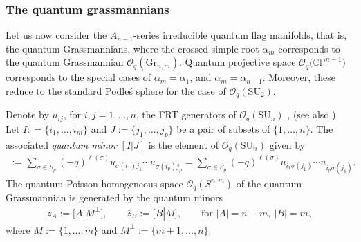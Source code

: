 \documentclass[10pt,a4paper]{amsart}
\numberwithin{equation}{section}
\begin{document}
\subsubsection{The quantum grassmannians}

Let us now consider the $A_{n-1}$-series irreducible quantum flag manifolds, that is, the quantum Grassmannians, where the crossed simple root $\alpha_m$ corresponds to the quantum Grassmannian $\mathcal{O}_q(\mathrm{Gr}_{n,m})$. Quantum projective space $\mathcal{O}_q\big(\mathbb{CP}^{n-1}\big)$ corresponds to the special cases of $\alpha_m = \alpha_1$, and $\alpha_m = \alpha_{n-1}$. Moreover, these reduce to the standard Podle\'s sphere for the case of $\mathcal{O}_q(\mathrm{SU}_2)$.

Denote by $u_{ij}$, for $i,j = 1, \dots, n$, the FRT generators of $\mathcal{O}_q(\mathrm{SU}_n)$ \cite{FRT89}, (see also \cite[Section~9.2]{KSLeabh}). Let $I: = \{i_1, \dots, i_m\}$ and $J:=\{j_1, \dots, j_p\}$ be a pair of subsets of $\{1,\dots, n\}$. The associated {\em quantum minor} $[I|J]$ is the element of $\mathcal{O}_q(\mathrm{SU}_n)$ given by
\begin{gather*}
[I|J] := \sum_{\sigma \in S_p} (-q)^{\ell(\sigma)}u_{\sigma(i_1)j_1} \cdots u_{\sigma(i_p)j_p} = \sum_{\sigma \in S_p} (-q)^{\ell(\sigma)} u_{i_1\sigma(j_1)} \cdots u_{i_p\sigma(j_p)}.
\end{gather*}
The quantum Poisson homogeneous space $\mathcal{O}_q(S^{n,m})$ of the quantum Grassmannian is generated by the quantum minors
\begin{gather*}
z_{A} := \big[A|M^{\perp}\big], \qquad \overline{z}_B := [B|M], \qquad \textrm{for } |A| = n-m, \ |B| = m,
\end{gather*}
where $M := \{1, \dots, m\}$ and $M^\perp:= \{m+1, \dots, n\}$.
\end{document}
